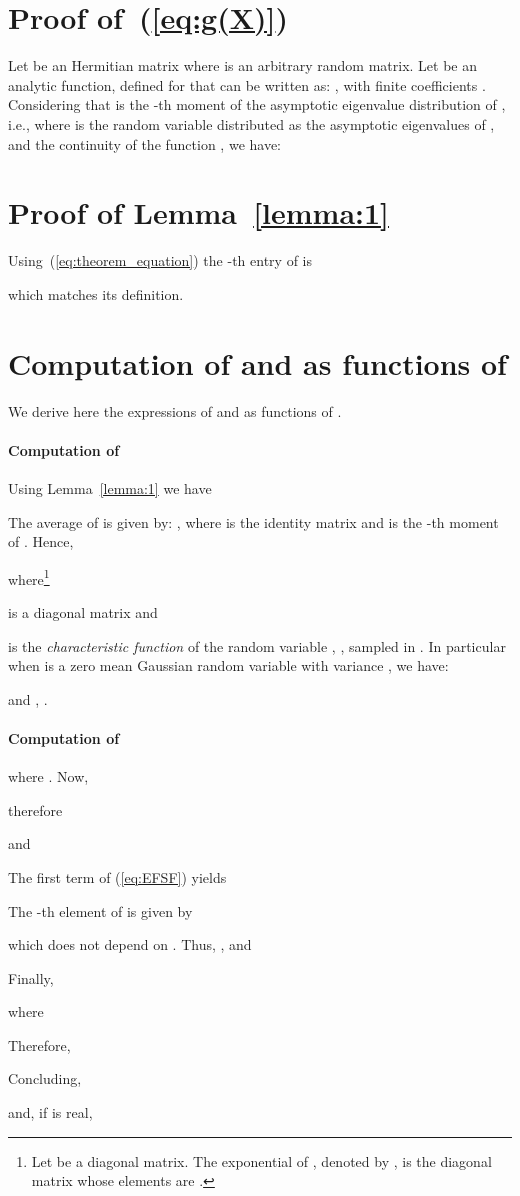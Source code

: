 \documentclass[final, a4paper]{IEEEtran}
\begin{document}
\appendices

\section{Proof of~(\ref{eq:g(X)})}
\label{app:proof3}
Let  be an Hermitian matrix where  is an arbitrary random matrix.
Let  be an analytic function, defined for  that can be written as:
, with finite coefficients .
Considering that  is the -th moment of the asymptotic eigenvalue
distribution of , i.e., 
where  is the random variable distributed as the asymptotic eigenvalues of ,
and the continuity of the function , we have:



\section{Proof of Lemma~\ref{lemma:1}}
\label{app:proof}
Using~(\ref{eq:theorem_equation}) the -th entry of  is

which matches its definition.


\section{Computation of  and
 as functions of }
\label{app:averages}

We derive here the expressions of  and
 as functions of .
\paragraph{Computation of }
Using Lemma~\ref{lemma:1} we have

The average of  is given by:
,
where  is the  identity matrix and 
is the -th moment of . Hence,

where\footnote{Let  be a diagonal  matrix.
The exponential of , denoted by , is the diagonal matrix whose elements
are .}

is a  diagonal matrix and

is the {\em characteristic function} of the random variable , ,
sampled in .
In particular when  is a zero mean Gaussian random variable with
variance , we have:

and , .

\paragraph{Computation of }

where .
Now,

therefore

and


The first term of (\ref{eq:EFSF}) yields

The -th element of  is given by

which does not depend on . Thus,
,
and

Finally,

where

Therefore,

Concluding,

and, if  is real,
\end{document}
